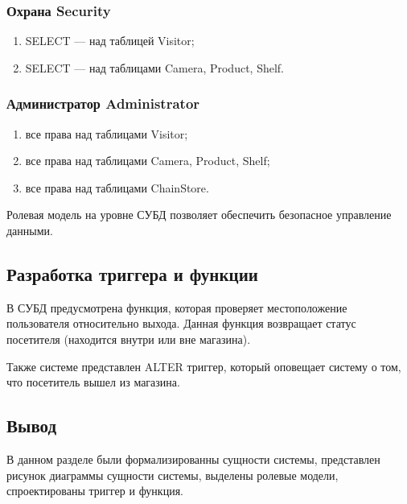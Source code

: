 \subsubsection{Охрана Security}

\begin{enumerate}[label=\arabic*.]
    \item SELECT --- над таблицей Visitor;
    \item SELECT --- над таблицами Camera, Product, Shelf.
\end{enumerate}


\subsubsection{Администратор Administrator}

\begin{enumerate}[label=\arabic*.]
    \item все права над таблицами Visitor;
    \item все права над таблицами Camera, Product, Shelf;
    \item все права над таблицами ChainStore.
\end{enumerate}

Ролевая модель на уровне СУБД позволяет обеспечить безопасное управление данными.

\subsection{Разработка триггера и функции}

В СУБД предусмотрена функция, которая проверяет местоположение пользователя относительно выхода. 
Данная функция возвращает статус посетителя (находится внутри или вне магазина).

Также системе представлен ALTER триггер, который оповещает систему о том, 
что посетитель вышел из магазина.



\subsection*{Вывод}

В данном разделе были формализированны сущности системы, представлен рисунок диаграммы сущности системы,
выделены ролевые модели, спроектированы триггер и функция.